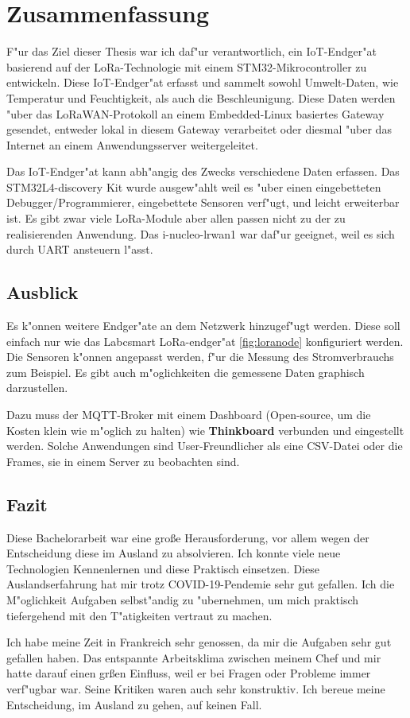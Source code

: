 \chapter{Zusammenfassung}\label{Fazit}

F"ur das Ziel dieser Thesis war ich daf"ur 
verantwortlich, ein IoT-Endger"at basierend auf der 
LoRa-Technologie mit einem STM32-Mikrocontroller zu 
entwickeln. Diese IoT-Endger"at erfasst und sammelt 
sowohl Umwelt-Daten, wie Temperatur und Feuchtigkeit, 
als auch die Beschleunigung. Diese Daten werden "uber 
das LoRaWAN-Protokoll an einem Embedded-Linux basiertes 
Gateway gesendet, entweder lokal in diesem Gateway 
verarbeitet oder diesmal "uber das Internet an einem 
Anwendungsserver weitergeleitet. 

Das IoT-Endger"at kann abh"angig des Zwecks 
verschiedene Daten erfassen. Das STM32L4-discovery Kit 
wurde ausgew"ahlt weil es "uber einen eingebetteten 
Debugger/Programmierer, eingebettete Sensoren verf"ugt, 
und leicht erweiterbar ist. Es gibt zwar viele 
LoRa-Module aber allen passen nicht zu der zu 
realisierenden Anwendung. Das i-nucleo-lrwan1 war 
daf"ur geeignet, weil es sich durch UART ansteuern 
l"asst.

\section{Ausblick}

Es k"onnen weitere Endger"ate an dem Netzwerk 
hinzugef"ugt werden. Diese soll einfach nur wie das 
Labcsmart LoRa-endger"at \ref{fig:loranode} 
konfiguriert werden. Die Sensoren k"onnen angepasst 
werden, f"ur die Messung des Stromverbrauchs zum 
Beispiel. Es gibt auch m"oglichkeiten die gemessene 
Daten graphisch darzustellen. 

Dazu muss der MQTT-Broker mit einem Dashboard 
(Open-source, um die Kosten klein wie m"oglich zu 
halten) wie \textbf{Thinkboard} verbunden und 
eingestellt werden. Solche Anwendungen sind 
User-Freundlicher als eine \ac{CSV}-Datei oder die 
Frames, sie in einem Server zu beobachten sind.

\section{Fazit}

Diese Bachelorarbeit war eine gro\ss{}e 
Herausforderung, vor allem wegen der Entscheidung diese 
im Ausland zu absolvieren. Ich konnte viele neue 
Technologien Kennenlernen und diese Praktisch einsetzen. 
Diese Auslandserfahrung  hat mir trotz 
COVID-19-Pendemie sehr gut gefallen. Ich die 
M"oglichkeit Aufgaben selbst"andig zu "ubernehmen, um 
mich praktisch tiefergehend mit den T"atigkeiten 
vertraut zu machen.

Ich habe meine Zeit in Frankreich sehr genossen, da mir 
die Aufgaben sehr gut gefallen haben. Das entspannte 
Arbeitsklima zwischen meinem Chef und mir hatte darauf 
einen gr\ss{}en Einfluss, weil er bei Fragen oder 
Probleme immer verf"ugbar war. Seine Kritiken waren 
auch sehr konstruktiv.  Ich bereue meine Entscheidung, 
im Ausland zu gehen, auf keinen Fall.    
